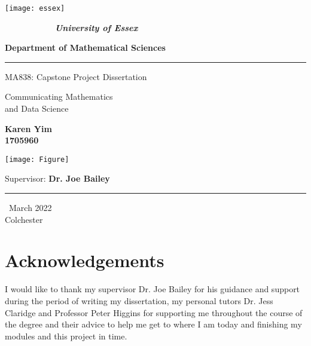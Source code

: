 \documentclass[12pt, a4paper,oneside]{book}
\numberwithin{equation}{section}
\begin{document}
\thispagestyle{empty}

\begin{minipage}{0.2\textwidth}
\centerline{\texttt{[image: essex]} }
\end{minipage}
\begin{minipage}{0.8\textwidth}

$ \qquad \qquad \qquad ${\LARGE \bf \sl University of Essex}

{\LARGE \bf Department of Mathematical Sciences}

\end{minipage}

\begin{center}

\noindent\textcolor{myred}{\rule{\linewidth}{4.8pt}}

\vspace{1cm}

{\LARGE \sc  MA838: Capstone  Project Dissertation}

\vspace{1.5cm}

{\Huge{\color{myblue}  Communicating Mathematics \\ and Data Science}}

\vspace{1.5cm}

{\Large \bf Karen Yim \\ 1705960}

\vspace{1.5cm}

\centerline{\texttt{[image: Figure]}}

\vspace{1.5cm}

{\Large {Supervisor:} {\color{mygreen} \bf Dr. Joe Bailey}}

\vspace{.25cm}

\noindent\textcolor{myred}{\rule{\linewidth}{4.8pt}}

\vspace{1cm}
{\Large \ March 2022 }\\[4pt]
{\Large Colchester}
\end{center}
\newpage
\tableofcontents

\listoffigures
\listoftables

\chapter{Acknowledgements}
I would like to thank my supervisor Dr. Joe Bailey for his guidance and support during the period of writing my dissertation, my personal tutors Dr. Jess Claridge and Professor Peter Higgins for supporting me throughout the course of the degree and their advice to help me get to where I am today and finishing my modules and this project in time.
\end{document}
